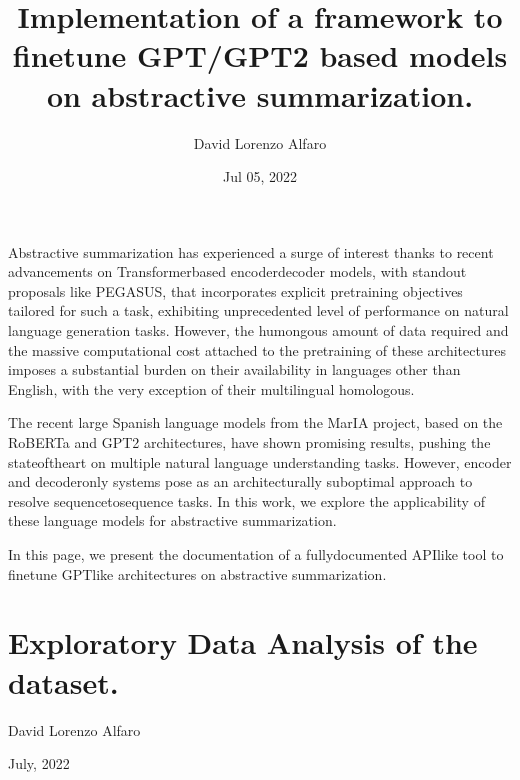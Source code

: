 \documentclass[letterpaper,10pt,english]{sphinxmanual}
\title{Implementation of a framework to fine\sphinxhyphen{}tune GPT/GPT2 based models on abstractive summarization.\@{}}
\date{Jul 05, 2022}
\author{David Lorenzo Alfaro}
\begin{document}
\pagestyle{empty}
\sphinxmaketitle
\pagestyle{plain}
\sphinxtableofcontents
\pagestyle{normal}
\label{\detokenize{index::doc}}


\sphinxAtStartPar
Abstractive summarization has experienced a surge of interest thanks to recent advancements on Transformer\sphinxhyphen{}based encoder\sphinxhyphen{}decoder models, with standout proposals like PEGASUS, that incorporates explicit pre\sphinxhyphen{}training objectives tailored for such a task, exhibiting unprecedented level of performance on natural language generation tasks. However, the humongous amount of data required and the massive computational cost attached to the pre\sphinxhyphen{}training of these architectures imposes a substantial burden on their availability in languages other than English, with the very exception of their multi\sphinxhyphen{}lingual homologous.

\sphinxAtStartPar
The recent large Spanish language models from the MarIA project, based on the RoBERTa and GPT\sphinxhyphen{}2 architectures, have shown promising results, pushing the state\sphinxhyphen{}of\sphinxhyphen{}the\sphinxhyphen{}art on multiple natural language understanding tasks. However, encoder\sphinxhyphen{} and decoder\sphinxhyphen{}only systems pose as an architecturally suboptimal approach to resolve sequence\sphinxhyphen{}to\sphinxhyphen{}sequence tasks. In this work, we explore the applicability of these language models for abstractive summarization.

\sphinxAtStartPar
In this page, we present the documentation of a fully\sphinxhyphen{}documented API\sphinxhyphen{}like tool to fine\sphinxhyphen{}tune GPT\sphinxhyphen{}like architectures on abstractive summarization.


\chapter{Exploratory Data Analysis of the  dataset.}
\label{\detokenize{eda:Exploratory-Data-Analysis-of-the-XL-Sum-dataset.}}\label{\detokenize{eda::doc}}
\sphinxAtStartPar
{}

\sphinxAtStartPar
David Lorenzo Alfaro

\sphinxAtStartPar
July, 2022
\end{document}
